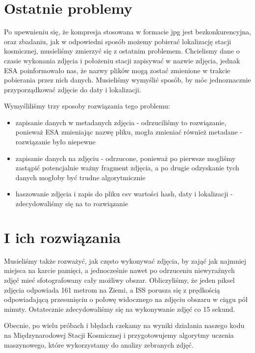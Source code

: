 \section{Ostatnie problemy}\label{sec:final_introduction}

Po upewnieniu się, że kompresja stosowana w formacie jpg jest bezkonkurencyjna,
oraz zbadaniu, jak w odpowiedni sposób możemy pobierać lokalizację stacji kosmicznej,
musieliśmy zmierzyć się z ostatnim problemem. Chcielismy dane o czasie wykonania
zdjęcia i położeniu stacji zapisywać w nazwie zdjęcia, jednak ESA poinformowało
nas, że nazwy plików mogą zostać zmienione w trakcie pobierania przez nich danych.
Musieliśmy wymyślić sposób, by móc jednoznacznie przyporządkować zdjęcie do daty
i lokalizacji.

Wymyśliliśmy trzy sposoby rozwiązania tego problemu:
\begin{itemize}
    \item zapisanie danych w metadanych zdjęcia - odrzuciliśmy to rozwiązanie, ponieważ
    ESA zmieniając nazwę pliku, mogła zmieniać również metadane - rozwiązanie było niepewne
    \item zapisanie danych na zdjęciu - odrzucone, ponieważ po pierwsze mogliśmy zastąpić
    potencjalnie ważny fragment zdjęcia, a po drugie odzyskanie tych danych mogłoby być
    trudne algorytmicznie
    \item haszowanie zdjęcia i zapis do pliku csv wartości hash, daty i lokalizacji -
    zdecydowaliśmy się na to rozwiązanie
\end{itemize}

\section{I ich rozwiązania}\label{sec:final_conclusion}

Musieliśmy także rozważyć, jak często wykonywać zdjęcia, by zająć jak najmniej miejsca na
karcie pamięci, a jednocześnie nawet po odrzuceniu niewyraźnych zdjęć mieć sfotografowany
cały możliwy obszar. Obliczyliśmy, że jeden piksel zdjęcia odpowiada 161 metrom na Ziemi,
a ISS porusza się z prędkością odpowiadającą przesunięciu o połowę widocznego na zdjęciu
obszaru w ciągu pół minuty. Ostatecznie zdecydowaliśmy się na wykonywanie zdjęć co 15 sekund.

Obecnie, po wielu próbach i błędach czekamy na wyniki działania naszego kodu na Międzynarodowej
Stacji Kosmicznej i przygotowujemy algorytmy uczenia maszynowego, które wykorzystamy do analizy
zebranych zdjęć.
